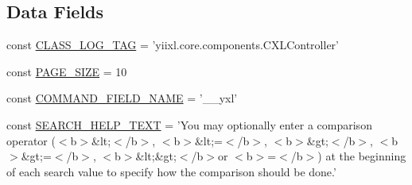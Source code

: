 \subsection*{Data Fields}
\begin{DoxyCompactItemize}
\item 
const \hyperlink{classCXLController_aa607ab5e557e6ebb60b85c5a20ad067f}{CLASS\_\-LOG\_\-TAG} = 'yiixl.core.components.CXLController'
\item 
const \hyperlink{classCXLController_a4634a091c35db33009455321e1d259e3}{PAGE\_\-SIZE} = 10
\item 
const \hyperlink{classCXLController_acfa3d37fd2964302d32a8905a102196d}{COMMAND\_\-FIELD\_\-NAME} = '\_\-\_\-yxl'
\item 
const \hyperlink{classCXLController_a21930d5a45a39f983d1b157fd28819dc}{SEARCH\_\-HELP\_\-TEXT} = 'You may optionally enter a comparison operator ($<$b$>$\&lt;$<$/b$>$, $<$b$>$\&lt;=$<$/b$>$, $<$b$>$\&gt;$<$/b$>$, $<$b$>$\&gt;=$<$/b$>$, $<$b$>$\&lt;\&gt;$<$/b$>$or $<$b$>$=$<$/b$>$) at the beginning of each search value to specify how the comparison should be done.'
\end{DoxyCompactItemize}
